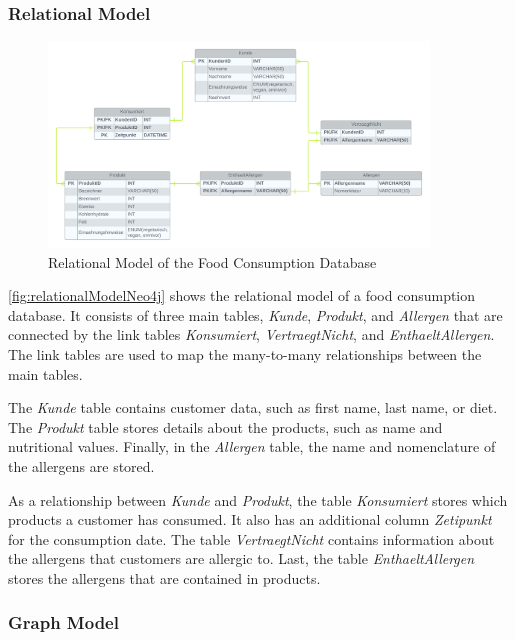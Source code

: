\subsubsection*{Relational Model}

\begin{figure}[H]
    \centering
    \caption{Relational Model of the Food Consumption Database}\label{fig:relationalModelNeo4j}
    \includegraphics[width=0.9\textwidth]{images/neo4j_example_relational_model.png}
\end{figure}

\autoref{fig:relationalModelNeo4j} shows the relational model of a food consumption database. It consists of three main tables, \textit{Kunde}, \textit{Produkt}, and \textit{Allergen} that are connected by the link tables \textit{Konsumiert}, \textit{VertraegtNicht}, and \textit{EnthaeltAllergen}. The link tables are used to map the many-to-many relationships between the main tables.

The \textit{Kunde} table contains customer data, such as first name, last name, or diet. The \textit{Produkt} table stores details about the products, such as name and nutritional values. Finally, in the \textit{Allergen} table, the name and nomenclature of the allergens are stored.

As a relationship between \textit{Kunde} and \textit{Produkt}, the table \textit{Konsumiert} stores which products a customer has consumed. It also has an additional column \textit{Zetipunkt} for the consumption date. The table \textit{VertraegtNicht} contains information about the allergens that customers are allergic to. Last, the table \textit{EnthaeltAllergen} stores the allergens that are contained in products.

\subsubsection*{Graph Model}

